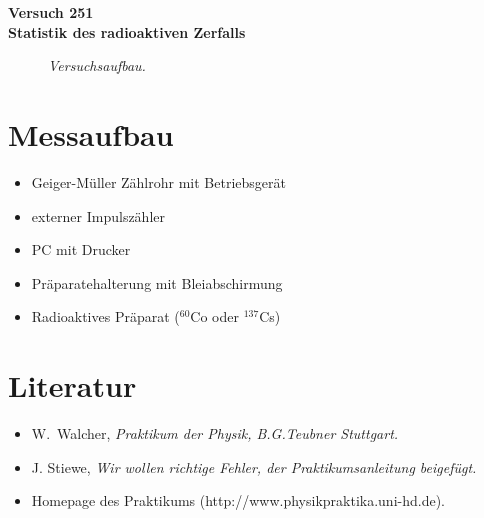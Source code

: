\documentclass[
    landscape,
    twocolumn
]{article}
\begin{document}
\setlength{\extrarowheight}{4pt} \pagestyle{fancyplain}

\cfoot{\large\vspace{0.1in}$\qquad$\rm\thepage}
 \setlength{\footrulewidth}{0.4pt}
\renewcommand{\thesection}{\Roman{section}}


\begin{center}
\LARGE\bf{Versuch 251\\ Statistik des radioaktiven Zerfalls}
\end{center}

\begin{figure}[h]
\begin{minipage}[c]{12cm}
\centering{}
\caption{\fontsize{10}{12}\it Versuchsaufbau.}
\end{minipage}
\end{figure}


\section{Messaufbau}
\begin{itemize}
 \item  Geiger-M\"{u}ller Z\"{a}hlrohr mit Betriebsger\"{a}t
 \item  externer Impulsz\"{a}hler
 \item PC mit Drucker
 \item Pr\"{a}paratehalterung mit Bleiabschirmung
 \item Radioaktives Pr\"{a}parat ($^{60}$Co oder $^{137}$Cs)
\end{itemize}

\section{Literatur}

\begin{itemize}
 \item W.~Walcher,  \it{Praktikum der Physik}\rm, B.G.Teubner
 Stuttgart.
\item J. Stiewe, \it Wir wollen richtige Fehler\rm, der
Praktikumsanleitung beigef\"{u}gt.
 \item  Homepage des Praktikums
(http://www.physikpraktika.uni-hd.de).
\end{itemize}
\end{document}
